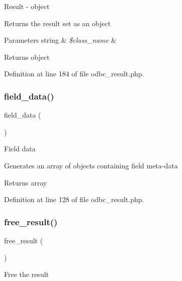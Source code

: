 Result -\/ object

Returns the result set as an object


\begin{DoxyParams}[1]{Parameters}
string & {\em \$class\+\_\+name} & \\
\hline
\end{DoxyParams}
\begin{DoxyReturn}{Returns}
object 
\end{DoxyReturn}


Definition at line 184 of file odbc\+\_\+result.\+php.

\mbox{\label{class_c_i___d_b__odbc__result_a84bffd65e53902ade1591716749a33e3}} 
\subsubsection{\texorpdfstring{field\_data()}{field\_data()}}
{\footnotesize\ttfamily field\+\_\+data (\begin{DoxyParamCaption}{ }\end{DoxyParamCaption})}

Field data

Generates an array of objects containing field meta-\/data

\begin{DoxyReturn}{Returns}
array 
\end{DoxyReturn}


Definition at line 128 of file odbc\+\_\+result.\+php.

\mbox{\label{class_c_i___d_b__odbc__result_aad2d98d6beb3d6095405356c6107b473}} 
\subsubsection{\texorpdfstring{free\_result()}{free\_result()}}
{\footnotesize\ttfamily free\+\_\+result (\begin{DoxyParamCaption}{ }\end{DoxyParamCaption})}

Free the result

